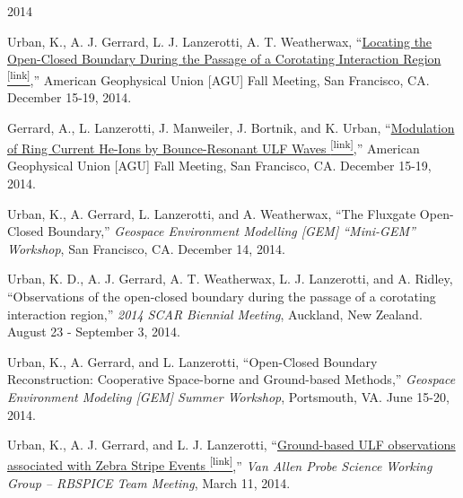 \begin{center} \Large{2014} \end{center}
\normalsize
\begin{itemize*}
  \item
    Urban, K., A. J. Gerrard, L. J. Lanzerotti, A. T. Weatherwax,
    ``\href{http://adsabs.harvard.edu/abs/2014AGUFMSA13B3992U}{Locating
    the Open-Closed Boundary During the Passage of a Corotating
    Interaction Region \textsuperscript{\tiny{[link]}}},'' American Geophysical Union [AGU]  Fall
    Meeting, San Francisco, CA. December 15-19, 2014.

  \item 
    Gerrard, A., L. Lanzerotti, J. Manweiler, J. Bortnik, and K. Urban,
    ``\href{https://scholar.google.com/citations?view_op=view_citation&hl=en&user=KTLuoQkAAAAJ&citation_for_view=KTLuoQkAAAAJ:0EnyYjriUFMC}{Modulation
    of Ring Current He-Ions by Bounce-Resonant ULF Waves \textsuperscript{\tiny{[link]}}},'' 
    American Geophysical Union [AGU] Fall Meeting, San Francisco, CA.
    December 15-19, 2014.

  \item Urban, K., A. Gerrard, L. Lanzerotti, and A. Weatherwax, ``The
    Fluxgate Open-Closed Boundary,'' {\em Geospace Environment Modelling
    [GEM] ``Mini-GEM'' Workshop}, San Francisco, CA. December 14, 2014.

  \item Urban, K. D., A. J. Gerrard, A. T. Weatherwax, L. J.
    Lanzerotti, and A. Ridley, ``Observations of the open-closed
    boundary during the passage of a corotating interaction
    region,'' {\em 2014 SCAR Biennial Meeting}, Auckland, New
    Zealand. August 23 - September 3, 2014.

  \item 
  Urban, K., A. Gerrard, and L. Lanzerotti, ``Open-Closed Boundary
  Reconstruction: Cooperative Space-borne and Ground-based Methods,''
  {\em Geospace Environment Modeling [GEM] Summer Workshop},
    Portsmouth, VA. June 15-20, 2014.

  \item
    Urban, K., A. J. Gerrard, and L. J. Lanzerotti,
    ``\href{http://rbspgway.jhuapl.edu/rbsp_SWG_Mar_2014}{Ground-based ULF
    observations associated with Zebra Stripe Events \textsuperscript{\tiny{[link]}}},'' {\em Van
    Allen Probe Science Working Group -- RBSPICE Team Meeting}, March 11,
    2014.

\end{itemize*}


